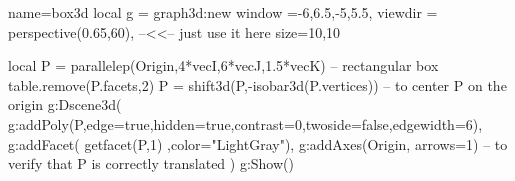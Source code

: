 \documentclass{standalone}
\begin{document}
\begin{luadraw}{name=box3d}
local g = graph3d:new{
    window ={-6,6.5,-5,5.5},
    viewdir = perspective(0.65,60), --<<-- just use it here
    size={10,10}
}

local P = parallelep(Origin,4*vecI,6*vecJ,1.5*vecK) -- rectangular box
table.remove(P.facets,2)
P = shift3d(P,-isobar3d(P.vertices)) -- to center P on the origin
g:Dscene3d(
    g:addPoly(P,{edge=true,hidden=true,contrast=0,twoside=false,edgewidth=6}),
    g:addFacet( getfacet(P,1) ,{color="LightGray"}),
    g:addAxes(Origin, {arrows=1}) -- to verify that P is correctly translated
)
g:Show()
\end{luadraw}
\end{document}
